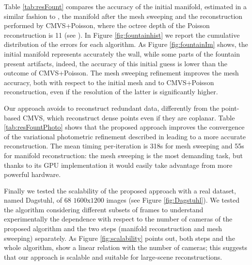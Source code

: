 Table \ref{tab:resFount} compares the accuracy of the initial manifold, estimated in a similar fashion to \cite{romanoni15b}, the manifold after the mesh sweeping and the reconstruction performed by CMVS+Poisson, where the octree depth of the Poisson reconstruction is 11 (see \cite{kazhdan2006poisson}). 
In Figure \ref{fig:fountainhist} we report the cumulative distribution of the errors for each algorithm.
As Figure \ref{fig:fountainIm} shows, the initial manifold represents accurately the wall, while some parts of the fountain present artifacts, indeed, the accuracy of this initial guess is lower than the outcome of CMVS+Poisson.
The mesh sweeping refinement improves the mesh accuracy, both with respect to the initial mesh and to CMVS+Poisson reconstruction, even if the resolution of the latter is significantly higher. 

Our approach avoids to reconstruct redundant data, differently from the point-based CMVS, which reconstruct dense points even if they are coplanar.
Table \ref{tab:resFountPhoto} shows that the proposed approach improves the convergence of the variational photometric refinement described in \cite{vu_et_al_2012} leading to a more accurate reconstruction. 
The mean timing per-iteration is 318s for mesh sweeping and 55s for manifold reconstruction: the mesh sweeping is the most demanding task, but thanks to its GPU implementation it would easily take advantage from more powerful hardware.

Finally we tested the scalability of the proposed approach with a real dataset, named Dagstuhl, of 68 $1600\text{x}1200$ images (see Figure \ref{fig:Dagstuhl}). 
We tested the algorithm considering different subsets of frames to understand experimentally the dependence with respect to the number of cameras of the proposed algorithm and the two steps (manifold reconstruction and mesh sweeping) separately. 
As Figure \ref{fig:scalability} points out, both steps and the whole algorithm, show a linear relation with the number of cameras; this suggests that our approach is scalable and suitable for large-scene reconstructions.



